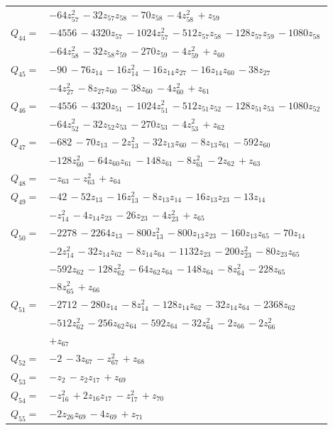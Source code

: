 \begin{longtable}{@{}r p{0.88\linewidth}@{}}
 & $-64z_{57}^{2}\,-32z_{57}z_{58}\,-70z_{58}\,-4z_{58}^{2}\,+z_{59}$\\[5pt]
$Q_{44}=$ & $-4556\,-4320z_{57}\,-1024z_{57}^{2}\,-512z_{57}z_{58}\,-128z_{57}z_{59}\,-1080z_{58}$\\
 & $-64z_{58}^{2}\,-32z_{58}z_{59}\,-270z_{59}\,-4z_{59}^{2}\,+z_{60}$\\[5pt]
$Q_{45}=$ & $-90\,-76z_{14}\,-16z_{14}^{2}\,-16z_{14}z_{27}\,-16z_{14}z_{60}\,-38z_{27}$\\
 & $-4z_{27}^{2}\,-8z_{27}z_{60}\,-38z_{60}\,-4z_{60}^{2}\,+z_{61}$\\[5pt]
$Q_{46}=$ & $-4556\,-4320z_{51}\,-1024z_{51}^{2}\,-512z_{51}z_{52}\,-128z_{51}z_{53}\,-1080z_{52}$\\
 & $-64z_{52}^{2}\,-32z_{52}z_{53}\,-270z_{53}\,-4z_{53}^{2}\,+z_{62}$\\[5pt]
$Q_{47}=$ & $-682\,-70z_{13}\,-2z_{13}^{2}\,-32z_{13}z_{60}\,-8z_{13}z_{61}\,-592z_{60}$\\
 & $-128z_{60}^{2}\,-64z_{60}z_{61}\,-148z_{61}\,-8z_{61}^{2}\,-2z_{62}\,+z_{63}$\\[5pt]
$Q_{48}=$ & $-z_{63}\,-z_{63}^{2}\,+z_{64}$\\[5pt]
$Q_{49}=$ & $-42\,-52z_{13}\,-16z_{13}^{2}\,-8z_{13}z_{14}\,-16z_{13}z_{23}\,-13z_{14}$\\
 & $-z_{14}^{2}\,-4z_{14}z_{23}\,-26z_{23}\,-4z_{23}^{2}\,+z_{65}$\\[5pt]
$Q_{50}=$ & $-2278\,-2264z_{13}\,-800z_{13}^{2}\,-800z_{13}z_{23}\,-160z_{13}z_{65}\,-70z_{14}$\\
 & $-2z_{14}^{2}\,-32z_{14}z_{62}\,-8z_{14}z_{64}\,-1132z_{23}\,-200z_{23}^{2}\,-80z_{23}z_{65}$\\
 & $-592z_{62}\,-128z_{62}^{2}\,-64z_{62}z_{64}\,-148z_{64}\,-8z_{64}^{2}\,-228z_{65}$\\
 & $-8z_{65}^{2}\,+z_{66}$\\[5pt]
$Q_{51}=$ & $-2712\,-280z_{14}\,-8z_{14}^{2}\,-128z_{14}z_{62}\,-32z_{14}z_{64}\,-2368z_{62}$\\
 & $-512z_{62}^{2}\,-256z_{62}z_{64}\,-592z_{64}\,-32z_{64}^{2}\,-2z_{66}\,-2z_{66}^{2}$\\
 & $+z_{67}$\\[5pt]
$Q_{52}=$ & $-2\,-3z_{67}\,-z_{67}^{2}\,+z_{68}$\\[5pt]
$Q_{53}=$ & $-z_{2}\,-z_{2}z_{17}\,+z_{69}$\\[5pt]
$Q_{54}=$ & $-z_{16}^{2}\,+2z_{16}z_{17}\,-z_{17}^{2}\,+z_{70}$\\[5pt]
$Q_{55}=$ & $-2z_{26}z_{69}\,-4z_{69}\,+z_{71}$\\[5pt]

\end{longtable}
